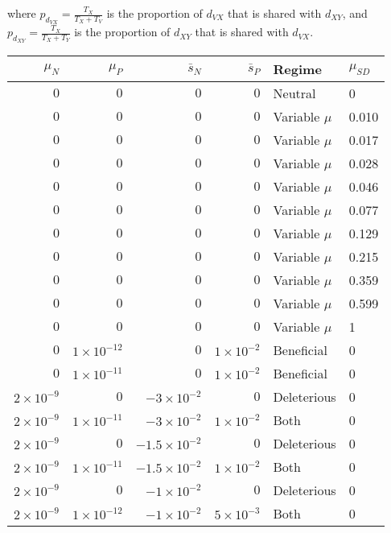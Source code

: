 where $p_{d_{VX}} = \frac{T_X}{T_X+T_V}$ is the proportion of $d_{VX}$ that is shared with $d_{XY}$, and $p_{d_{XY}} = \frac{T_X}{T_X+T_Y}$ is the proportion of $d_{XY}$ that is shared with $d_{VX}$.


\begin{table}[ht]
\centering
\begin{tabular}{rrrrll}
  \hline
$\mu_N$ & $\mu_P$ & $\bar{s}_N$ & $\bar{s}_P$ & Regime & $\mu_{SD}$ \\ 
  \hline
$0$ & $0$ & $0$ & $0$ & Neutral & 0 \\ 
  $0$ & $0$ & $0$ & $0$ & Variable $\mu$ & 0.010 \\ 
  $0$ & $0$ & $0$ & $0$ & Variable $\mu$ & 0.017 \\ 
  $0$ & $0$ & $0$ & $0$ & Variable $\mu$ & 0.028 \\ 
  $0$ & $0$ & $0$ & $0$ & Variable $\mu$ & 0.046 \\ 
  $0$ & $0$ & $0$ & $0$ & Variable $\mu$ & 0.077 \\ 
  $0$ & $0$ & $0$ & $0$ & Variable $\mu$ & 0.129 \\ 
  $0$ & $0$ & $0$ & $0$ & Variable $\mu$ & 0.215 \\ 
  $0$ & $0$ & $0$ & $0$ & Variable $\mu$ & 0.359 \\ 
  $0$ & $0$ & $0$ & $0$ & Variable $\mu$ & 0.599 \\ 
  $0$ & $0$ & $0$ & $0$ & Variable $\mu$ & 1 \\ 
  $0$ & $1 \times 10^{-12}$ & $0$ & $1 \times 10^{-2}$ & Beneficial & 0 \\ 
  $0$ & $1 \times 10^{-11}$ & $0$ & $1 \times 10^{-2}$ & Beneficial & 0 \\ 
  $2 \times 10^{-9}$ & $0$ & $-3 \times 10^{-2}$ & $0$ & Deleterious & 0 \\ 
  $2 \times 10^{-9}$ & $1 \times 10^{-11}$ & $-3 \times 10^{-2}$ & $1 \times 10^{-2}$ & Both & 0 \\ 
  $2 \times 10^{-9}$ & $0$ & $-1.5 \times 10^{-2}$ & $0$ & Deleterious & 0 \\ 
  $2 \times 10^{-9}$ & $1 \times 10^{-11}$ & $-1.5 \times 10^{-2}$ & $1 \times 10^{-2}$ & Both & 0 \\ 
  $2 \times 10^{-9}$ & $0$ & $-1 \times 10^{-2}$ & $0$ & Deleterious & 0 \\ 
  $2 \times 10^{-9}$ & $1 \times 10^{-12}$ & $-1 \times 10^{-2}$ & $5 \times 10^{-3}$ & Both & 0 \\ 

\end{tabular}
\end{table}
